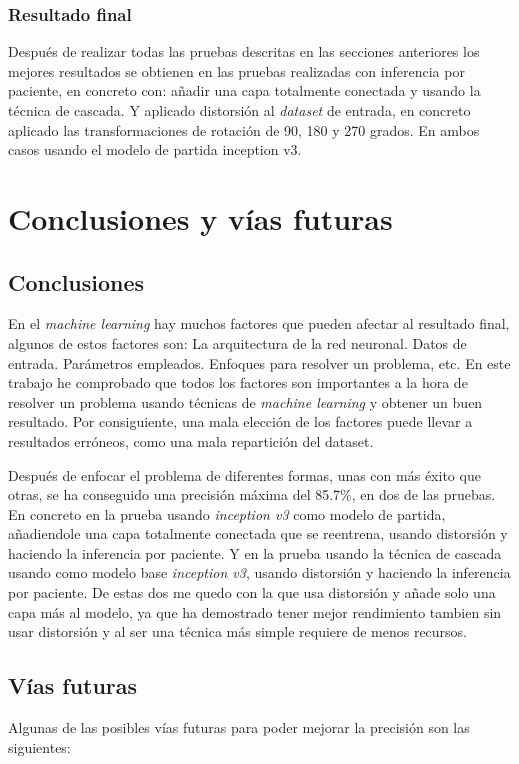 \documentclass[12pt,a4paper]{article}
\begin{document}
\subsubsection{Resultado final}
Después de realizar todas las pruebas descritas en las secciones anteriores los mejores resultados se obtienen en las pruebas realizadas con inferencia por paciente, en concreto con: añadir una capa totalmente conectada y usando la técnica de cascada. Y aplicado distorsión al \textit{dataset} de entrada, en concreto aplicado las transformaciones de rotación de 90, 180 y 270 grados. En ambos casos usando el modelo de partida inception v3.

\newpage
\section{Conclusiones y vías futuras}
\subsection{Conclusiones}
En el \textit{machine learning} hay muchos factores que pueden afectar al resultado final, algunos de estos factores son: La arquitectura de la red neuronal. Datos de entrada. Parámetros empleados. Enfoques para resolver un problema, etc. En este trabajo he comprobado que todos los factores son importantes a la hora de resolver un problema usando técnicas de \textit{machine learning} y obtener un buen resultado. Por consiguiente, una mala elección de los factores puede llevar a resultados erróneos, como una mala repartición del dataset.
\bigskip

Después de enfocar el problema de diferentes formas, unas con más éxito que otras, se ha conseguido una precisión máxima del 85.7\%, en dos de las pruebas. En concreto en la prueba usando \textit{inception v3} como modelo de partida, añadiendole una capa totalmente conectada que se reentrena, usando distorsión y haciendo la inferencia por paciente. Y en la prueba usando la técnica de cascada usando como modelo base \textit{inception v3}, usando distorsión y haciendo la inferencia por paciente. De estas dos me quedo con la que usa distorsión y añade solo una capa más al modelo, ya que ha demostrado tener mejor rendimiento tambien sin usar distorsión y al ser una técnica más simple requiere de menos recursos.

\subsection{Vías futuras}
Algunas de las posibles vías futuras para poder mejorar la precisión son las siguientes:
\end{document}
